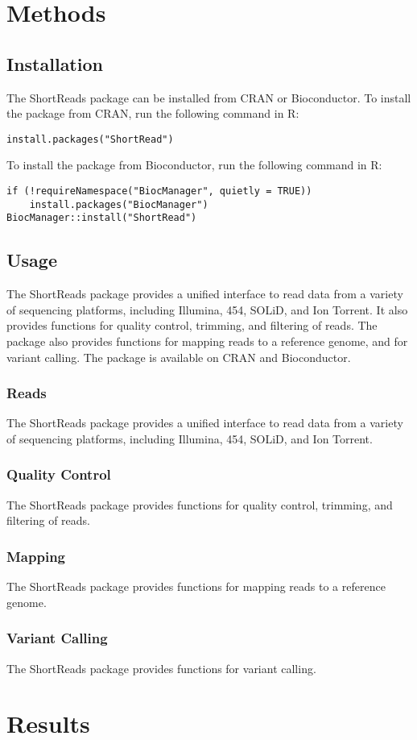 \documentclass[12pt]{article}
\begin{document}
\section{Methods}

\subsection{Installation}
The ShortReads package can be installed from CRAN or Bioconductor. To install the package from CRAN, run the following command in R:
\begin{verbatim}
install.packages("ShortRead")
\end{verbatim}
To install the package from Bioconductor, run the following command in R:
\begin{verbatim}
if (!requireNamespace("BiocManager", quietly = TRUE))
    install.packages("BiocManager")
BiocManager::install("ShortRead")
\end{verbatim}

\subsection{Usage}
The ShortReads package provides a unified interface to read data from a variety of sequencing platforms,
including Illumina, 454, SOLiD, and Ion Torrent.
It also provides functions for quality control, trimming, and filtering of reads.
The package also provides functions for mapping reads to a reference genome, and for variant calling.
The package is available on CRAN and Bioconductor.

\subsubsection{Reads}
The ShortReads package provides a unified interface to read data from a variety of sequencing platforms, including Illumina, 454, SOLiD, and Ion Torrent.

\subsubsection{Quality Control}
The ShortReads package provides functions for quality control, trimming, and filtering of reads.

\subsubsection{Mapping}
The ShortReads package provides functions for mapping reads to a reference genome.

\subsubsection{Variant Calling}
The ShortReads package provides functions for variant calling.

\section{Results}




\end{document}
